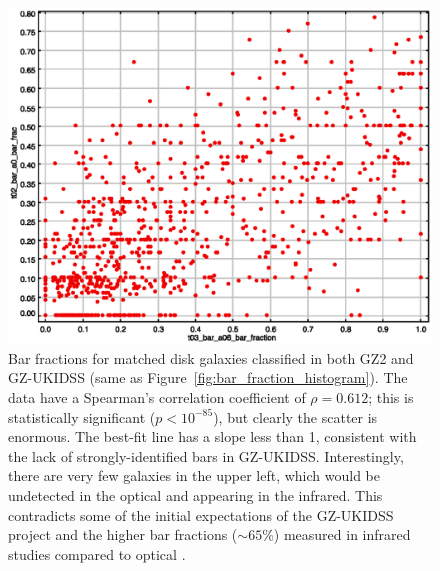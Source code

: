 \documentclass[useAMS,usenatbib]{mn2e}
\begin{document}
\begin{figure}
\includegraphics[scale=1.0]{figures/scatter.eps}
\caption{
    Bar fractions for matched disk galaxies classified in both GZ2 and GZ-UKIDSS (same as Figure~\ref{fig:bar_fraction_histogram}). The data have a Spearman's correlation coefficient of $\rho=0.612$; this is statistically significant ($p<10^{-85}$), but clearly the scatter is enormous. The best-fit line has a slope less than 1, consistent with the lack of strongly-identified bars in GZ-UKIDSS. Interestingly, there are very few galaxies in the upper left, which would be undetected in the optical and appearing in the infrared. This contradicts some of the initial expectations of the GZ-UKIDSS project and the higher bar fractions ($\sim65\%$) measured in infrared studies \citet{why02,mar07a,men07a,she08a} compared to optical \citep{bar08,mas11c,lee12}.
}
\label{fig:scatter}
\end{figure}
%
\end{document}
